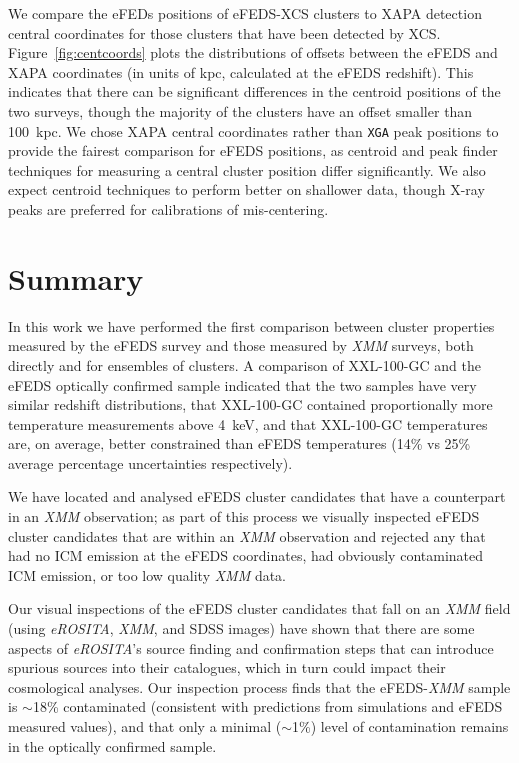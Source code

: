\documentclass[fleqn,usenatbib]{mnras}
\begin{document}
We compare the eFEDs positions of eFEDS-XCS clusters to XAPA detection central coordinates for those clusters that have been detected by XCS.  Figure~\ref{fig:centcoords} plots the distributions of offsets between the eFEDS and XAPA coordinates (in units of kpc, calculated at the eFEDS redshift). This indicates that there can be significant differences in the centroid positions of the two surveys, though the majority of the clusters have an offset smaller than 100~kpc. We chose XAPA central coordinates rather than \texttt{XGA} peak positions to provide the fairest comparison for eFEDS positions, as centroid and peak finder techniques for measuring a central cluster position differ significantly. We also expect centroid techniques to perform better on shallower data, though X-ray peaks are preferred for calibrations of mis-centering. 


\section{Summary}
\label{sec:summary}

In this work we have performed the first comparison between cluster properties measured by the eFEDS survey and those measured by {\em XMM} surveys, both directly and for ensembles of clusters. A comparison of XXL-100-GC and the eFEDS optically confirmed sample indicated that the two samples have very similar redshift distributions, that XXL-100-GC contained proportionally more temperature measurements above 4~keV, and that XXL-100-GC temperatures are, on average, better constrained than eFEDS temperatures (14\% vs 25\% average percentage uncertainties respectively).

We have located and analysed eFEDS cluster candidates that have a counterpart in an {\em XMM} observation; as part of this process we visually inspected eFEDS cluster candidates that are within an {\em XMM} observation and rejected any that had no ICM emission at the eFEDS coordinates, had obviously contaminated ICM emission, or too low quality {\em XMM} data.

Our visual inspections of the eFEDS cluster candidates that fall on an {\em XMM} field (using {\em eROSITA}, {\em XMM}, and SDSS images) have shown that there are some aspects of {\em eROSITA}'s source finding and confirmation steps that can introduce spurious sources into their catalogues, which in turn could impact their cosmological analyses. Our inspection process finds that the eFEDS-{\em XMM} sample is ${\sim}$18\% contaminated (consistent with predictions from simulations and eFEDS measured values), and that only a minimal (${\sim}$1\%) level of contamination remains in the optically confirmed sample.
\end{document}
